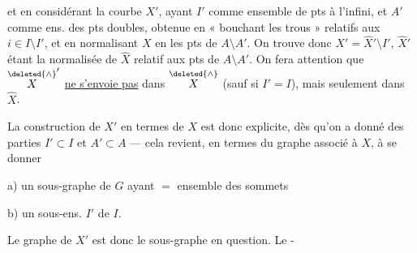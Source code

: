 et en considérant la courbe $X'$, ayant $I'$ comme ensemble de pts à l'infini, et $A'$ comme ens. des pts doubles, obtenue en « bouchant les trous » relatifs aux $i\in I\setminus I'$,  et en normalisant $X$ en les pts de $A\setminus A'$. On trouve donc $X'=\widehat X'\setminus I'$, $\widehat X'$ étant la normalisée de $\widehat X$ relatif aux pts de $A\setminus A'$. On fera attention que $\overset{\deleted{\wedge}}{X}'$ \uline{ne s'envoie pas} dans $\overset{\deleted{\wedge}}{X}$ (sauf si $I'=I$), mais seulement dans $\widehat X$.

 La construction de $X'$ en termes de $X$ est donc explicite, dès qu'on a donné des parties $I'\subset I$ et $A'\subset A$ --- cela revient, en termes du  graphe associé à $X$, à se donner

\noindent a) un sous-graphe  de $G$ ayant $=$ ensemble des sommets

\noindent b) un sous-ens. $I'$ de $I$.

 Le graphe de $X'$ est donc le sous-graphe en question. Le -
